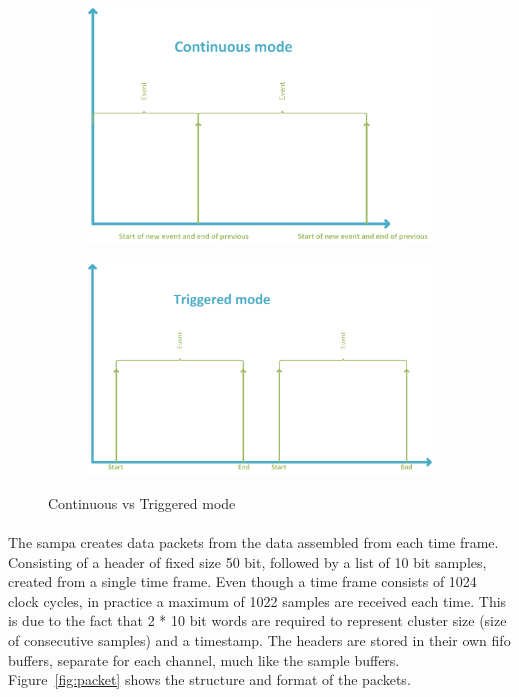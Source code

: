 \documentclass[a4paper, 12pt]{report}
\begin{document}
\begin{figure}[t!]
	\centering
		\begin{subfigure}[]{0.9\textwidth}
			\label{fig:cont}
			\includegraphics[width=\textwidth]{images/cont-mode.png}
		\end{subfigure}
		\begin{subfigure}[]{0.9\textwidth}
			\label{fig:trig}
			\includegraphics[width=\textwidth]{images/triggered-mode.png}
		\end{subfigure}
	\caption{Continuous vs Triggered mode}
	\label{fig:cont-vs-trig}
\end{figure}

\paragraph{}
The \gls{sampa} creates data packets from the data assembled from each time frame.
Consisting of a header of fixed size 50 bit, followed by a list of 10 bit samples, created from a single time frame.
Even though a time frame consists of 1024 clock cycles, in practice a maximum of 1022 samples are received each time.
This is due to the fact that 2 * 10 bit words are required to represent cluster size (size of consecutive samples) and a timestamp.
The headers are stored in their own \gls{fifo} buffers, separate for each channel, much like the sample buffers.
Figure~\ref{fig:packet} shows the structure and format of the packets.
\end{document}
